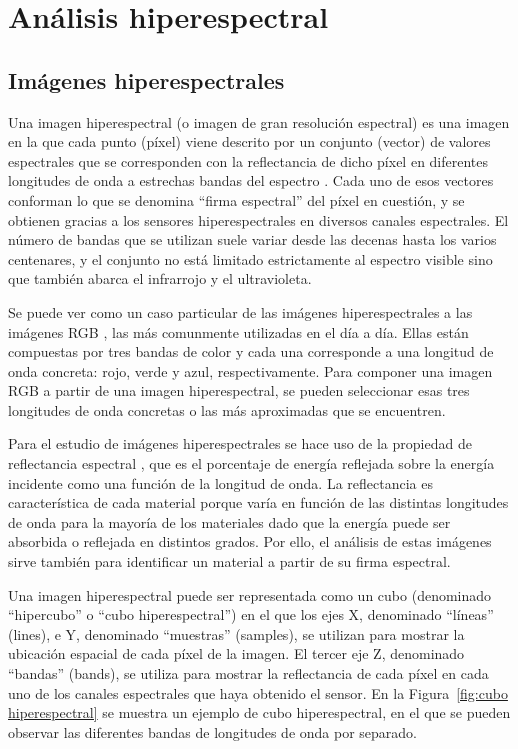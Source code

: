 \mbox{}

\chapter{Análisis hiperespectral}
\label{ch:chapter2}

\section{Imágenes hiperespectrales}

Una imagen hiperespectral (o imagen de gran resolución espectral) es una imagen en la que cada punto (píxel) viene descrito por un conjunto (vector) de valores espectrales que se corresponden con la reflectancia de dicho píxel en diferentes longitudes de onda a estrechas bandas del espectro \cite{biblio:image_clasification}. Cada uno de esos vectores conforman lo que se denomina “firma espectral” \cite{biblio:hyper_analysis, biblio:Tesis_Carlos} del píxel en cuestión, y se obtienen gracias a los sensores hiperespectrales en diversos canales espectrales. El número de bandas que se utilizan suele variar desde las decenas hasta los varios centenares, y el conjunto no está limitado estrictamente al espectro visible sino que también abarca el infrarrojo y el ultravioleta. 

Se puede ver como un caso particular de las imágenes hiperespectrales a las imágenes RGB \cite{biblio:TFM_Pablo_VCA}, las más comunmente utilizadas en el día a día. Ellas están compuestas por tres bandas de color y cada una corresponde a una longitud de onda concreta: rojo, verde y azul, respectivamente. Para componer una imagen RGB a partir de una imagen hiperespectral, se pueden seleccionar esas tres longitudes de onda concretas o las más aproximadas que se encuentren.

Para el estudio de imágenes hiperespectrales se hace uso de la propiedad de reflectancia espectral \cite{biblio:TFG_Esquembri}, que es el porcentaje de energía reflejada sobre la energía incidente como una función de la longitud de onda. La reflectancia es característica de cada material porque varía en función de las distintas longitudes de onda para la mayoría de los materiales dado que la energía puede ser absorbida o reflejada en distintos grados. Por ello, el análisis de estas imágenes sirve también para identificar un material a partir de su firma espectral.

Una imagen hiperespectral puede ser representada como un cubo (denominado “hipercubo” o “cubo hiperespectral”) en el que los ejes X, denominado “líneas” (lines), e Y, denominado “muestras” (samples), se utilizan para mostrar la ubicación espacial de cada píxel de la imagen. El tercer eje Z, denominado “bandas” (bands), se utiliza para mostrar la reflectancia de cada píxel en cada uno de los canales espectrales que haya obtenido el sensor. En la Figura~\ref{fig:cubo hiperespectral} \cite{biblio:TFG_Esquembri} se muestra un ejemplo de cubo hiperespectral, en el que se pueden observar las diferentes bandas de longitudes de onda por separado.

